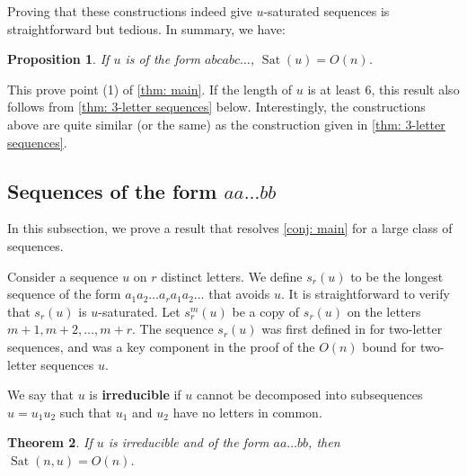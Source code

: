 \documentclass[12pt]{amsart}
\DeclareMathOperator{\Sat}{Sat}
\newtheorem{thm}{Theorem}
\newtheorem{prop}[thm]{Proposition}
\theoremstyle{definition}
\numberwithin{equation}{section}
\numberwithin{table}{thm}
\begin{document}
Proving that these constructions indeed give $u$-saturated sequences is straightforward but tedious. In summary, we have:
\begin{prop}\label{prop: generalized alternations}
    If $u$ is of the form $abcabc\dots$, $\Sat(u) = O(n)$.
\end{prop}
This prove point (1) of \cref{thm: main}.
If the length of $u$ is at least $6$, this result also follows from \cref{thm: 3-letter sequences} below. Interestingly, the constructions above are quite similar (or the same) as the construction given in \cref{thm: 3-letter sequences}.

\subsection{Sequences of the form \texorpdfstring{$aa\dots bb$}{aa...bb}}
In this subsection, we prove a result that resolves \cref{conj: main} for a large class of sequences.

Consider a sequence $u$ on $r$ distinct letters. We define $s_r(u)$ to be the longest sequence of the form $a_1a_2\dots a_r a_1 a_2\dots$ that avoids $u$. It is straightforward to verify that $s_r(u)$ is $u$-saturated. Let $s_r^m(u)$ be a copy of $s_r(u)$ on the letters $m+1,m+2,\dots,m+r$. The sequence $s_r(u)$ was first defined in \cite{ANAND2025382} for two-letter sequences, and was a key component in the proof of the $O(n)$ bound for two-letter sequences $u$. 

We say that $u$ is \textbf{irreducible} if $u$ cannot be decomposed into subsequences $u=u_1u_2$ such that $u_1$ and $u_2$ have no letters in common.

\begin{thm}\label{thm: aa...bb}
If $u$ is irreducible and of the form $aa\dots bb$, then $\Sat(n,u)=O(n)$.
\end{thm}
\end{document}
